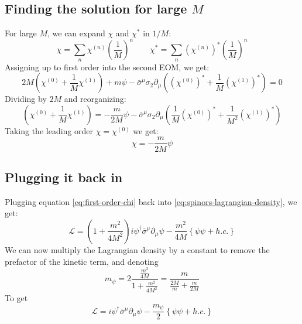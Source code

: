 \documentclass{article}
\begin{document}
\subsection{Finding the solution for large $M$}
For large $M$, we can expand $\chi$ and $\chi^*$ in $1/M$:
\begin{equation}
    \chi = \sum_n \chi^{(n)} \left(\frac{1}{M}\right)^n
    \qquad
    \chi^* = \sum_n \left(\chi^{(n)}\right)^* \left(\frac{1}{M}\right)^n
\end{equation}
Assigning up to first order into the second EOM, we get:
\begin{equation}
    2M\left(\chi^{(0)} + \frac{1}{M}\chi^{(1)}\right) + m\psi - \bar{\sigma}^{\mu}\sigma_2\partial_\mu \left(\left(\chi^{(0)}\right)^* + \frac{1}{M}\left(\chi^{(1)}\right)^*\right) = 0
\end{equation}
Dividing by $2M$ and reorganizing:
\begin{equation}
    \left(\chi^{(0)} + \frac{1}{M}\chi^{(1)}\right) = - \frac{m}{2M} \psi - \bar{\sigma}^{\mu}\sigma_2\partial_\mu \left(\frac{1}{M}\left(\chi^{(0)}\right)^* + \frac{1}{M^2}\left(\chi^{(1)}\right)^*\right)
\end{equation}
Taking the leading order $\chi = \chi^{(0)}$ we get:
\begin{equation}
\label{eq:first-order-chi}
    \chi = - \frac{m}{2M} \psi
\end{equation}
\subsection{Plugging it back in}
Plugging equation \ref{eq:first-order-chi} back into \ref{eq:spinors-lagrangian-density}, we get:
\begin{equation}
    \mathcal{L} = \left(1 + \frac{m^2}{4M^2}\right)i\psi^{\dagger}\bar{\sigma}^\mu\partial_\mu\psi - \frac{m^2}{4M}\left\{\psi\psi + h.c.\right\}
\end{equation}
We can now multiply the Lagrangian density by a constant to remove the prefactor of the kinetic term, and denoting
\begin{equation}
    m_\psi = 2 \frac{\frac{m^2}{4M}}{1 + \frac{m^2}{4M^2}} = \frac{m}{\frac{2M}{m} + \frac{m}{2M}}
\end{equation}
To get
\begin{equation}
    \mathcal{L} = i\psi^{\dagger}\bar{\sigma}^\mu\partial_\mu\psi - \frac{m_\psi}{2}\left\{\psi\psi + h.c.\right\}
\end{equation}
\end{document}
